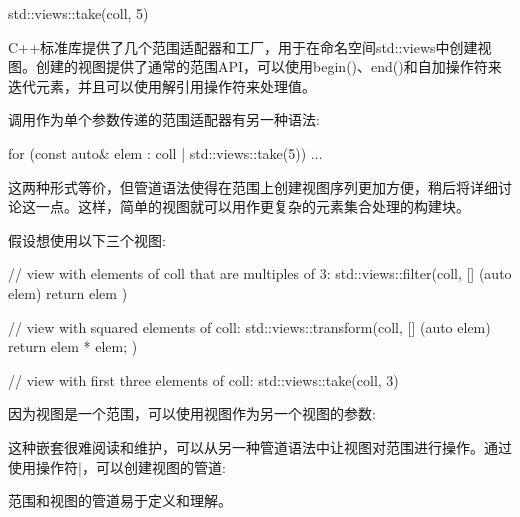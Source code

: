 \begin{cpp}
std::views::take(coll, 5)
\end{cpp}

C++标准库提供了几个范围适配器和工厂，用于在命名空间std::views中创建视图。创建的视图提供了通常的范围API，可以使用begin()、end()和自加操作符来迭代元素，并且可以使用解引用操作符来处理值。


调用作为单个参数传递的范围适配器有另一种语法:

\begin{cpp}
for (const auto& elem : coll | std::views::take(5)) {
	...
}
\end{cpp}

这两种形式等价，但管道语法使得在范围上创建视图序列更加方便，稍后将详细讨论这一点。这样，简单的视图就可以用作更复杂的元素集合处理的构建块。

假设想使用以下三个视图:

\begin{cpp}
// view with elements of coll that are multiples of 3:
std::views::filter(coll, [] (auto elem) {
	return elem %
})

// view with squared elements of coll:
std::views::transform(coll, [] (auto elem) {
	return elem * elem;
})

// view with first three elements of coll:
std::views::take(coll, 3)
\end{cpp}

因为视图是一个范围，可以使用视图作为另一个视图的参数:


这种嵌套很难阅读和维护，可以从另一种管道语法中让视图对范围进行操作。通过使用操作符|，可以创建视图的管道:


范围和视图的管道易于定义和理解。

